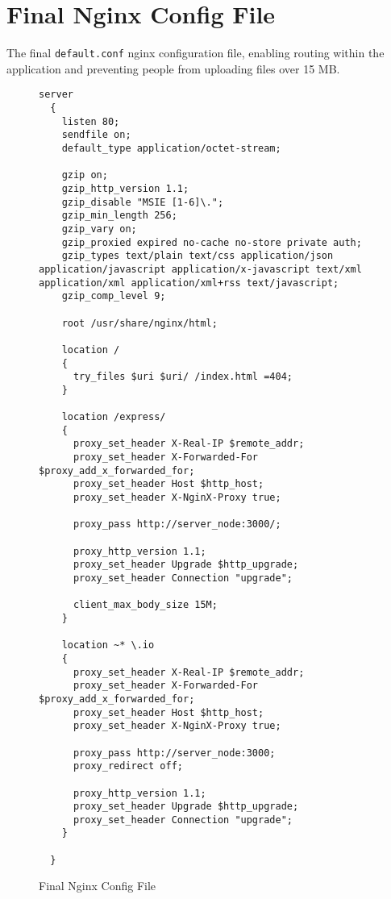 \newpage
\section{Final Nginx Config File}
The final \texttt{default.conf} nginx configuration file, enabling routing within the
application and preventing people from uploading files over 15 MB.

\begin{figure}[h!]
  \begin{lstlisting}[basicstyle=\tiny, breaklines=true]
  server
  {
    listen 80;
    sendfile on;
    default_type application/octet-stream;

    gzip on;
    gzip_http_version 1.1;
    gzip_disable "MSIE [1-6]\.";
    gzip_min_length 256;
    gzip_vary on;
    gzip_proxied expired no-cache no-store private auth;
    gzip_types text/plain text/css application/json application/javascript application/x-javascript text/xml application/xml application/xml+rss text/javascript;
    gzip_comp_level 9;

    root /usr/share/nginx/html;

    location /
    {
      try_files $uri $uri/ /index.html =404;
    }

    location /express/
    {
      proxy_set_header X-Real-IP $remote_addr;
      proxy_set_header X-Forwarded-For $proxy_add_x_forwarded_for;
      proxy_set_header Host $http_host;
      proxy_set_header X-NginX-Proxy true;

      proxy_pass http://server_node:3000/;

      proxy_http_version 1.1;
      proxy_set_header Upgrade $http_upgrade;
      proxy_set_header Connection "upgrade";

      client_max_body_size 15M;
    }

    location ~* \.io
    {
      proxy_set_header X-Real-IP $remote_addr;
      proxy_set_header X-Forwarded-For $proxy_add_x_forwarded_for;
      proxy_set_header Host $http_host;
      proxy_set_header X-NginX-Proxy true;

      proxy_pass http://server_node:3000;
      proxy_redirect off;

      proxy_http_version 1.1;
      proxy_set_header Upgrade $http_upgrade;
      proxy_set_header Connection "upgrade";
    }

  }
  \end{lstlisting}
  \caption{Final Nginx Config File}
  \label{sample:nginx}
\end{figure}

